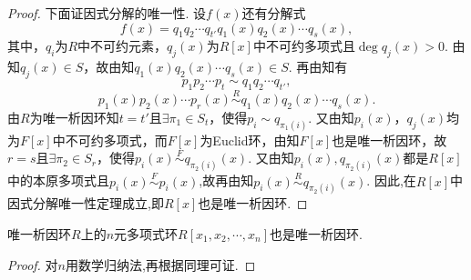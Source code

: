 \documentclass[../../main.tex]{subfiles}%
\begin{document}
\begin{proof}
下面证因式分解的唯一性. 设$f(x)$还有分解式
\[
f(x) = q_1q_2\cdots q_{t'}q_1(x)q_2(x)\cdots q_s(x),
\]
其中，$q_i$为$R$中不可约元素，$q_j(x)$为$R[x]$中不可约多项式且$\deg q_j(x) > 0$. 由知$q_j(x) \in S$，故由知$q_1(x)q_2(x)\cdots q_s(x) \in S$. 再由知有
\[
p_1p_2\cdots p_t \sim q_1q_2\cdots q_{t'},
\]
\[
p_1(x)p_2(x)\cdots p_r(x) \stackrel{R}{\sim} q_1(x)q_2(x)\cdots q_s(x).
\]
由$R$为唯一析因环知$t = t'$且$\exists \pi_1 \in S_t$，使得$p_i \sim q_{\pi_1(i)}$. 又由知$p_i(x)$，$q_j(x)$均为$F[x]$中不可约多项式，而$F[x]$为Euclid环，由知$F[x]$也是唯一析因环，故$r = s$且$\exists \pi_2 \in S_r$，使得$p_i(x) \stackrel{F}{\sim} q_{\pi_2(i)}(x)$.
又由知$p_i(x),q_{\pi_2(i)}(x)$都是$R[x]$中的本原多项式且$p_i(x)\stackrel{F}{\sim} p_i(x)$,故再由知$p_i(x) \stackrel{R}{\sim} q_{\pi_2(i)}(x)$. 因此,在$R[x]$中因式分解唯一性定理成立,即$R[x]$也是唯一析因环.
\end{proof}

\begin{corollary}\label{corollary:抽象代数--推论2.7.1}
唯一析因环$R$上的$n$元多项式环$R[x_1, x_2, \cdots, x_n]$也是唯一析因环.
\end{corollary}
\begin{proof}
对$n$用数学归纳法,再根据同理可证.
\end{proof}
\end{document}
